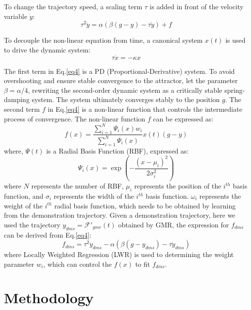 \documentclass[conference]{IEEEtran}
\begin{document}
To change the trajectory speed, a scaling term $\tau$ is added in front of the velocity variable $\dot y$:
\begin{equation}
    \tau^2 \ddot y = \alpha(\beta(g-y)-\tau \dot y) + f
\end{equation}

To decouple the non-linear equation from time, a canonical system $x(t)$ is used to drive the dynamic system:
\begin{equation}
    \tau \dot x = - \kappa x
\end{equation}

The first term in Eq.\ref{eq4} is a PD (Proportional-Derivative) system. To avoid overshooting and ensure stable convergence to the attractor, let the parameter $\beta = \alpha / 4$, rewriting the second-order dynamic system as a critically stable spring-damping system. The system ultimately converges stably to the position $g$. The second term $f$ in Eq.\ref{eq4} is a non-linear function that controls the intermediate process of convergence. The non-linear function $f$ can be expressed as:
\begin{equation}
    f(x)=\frac{\sum\limits_{i=1}^{N} \Psi_{i}(x) w_{i}}{\sum\limits_{i=1}^{N} \Psi_{i}(x)}x(t)(g-y)
    \label{eq5}
\end{equation}
where, $\Psi(t)$ is a Radial Basis Function (RBF), expressed as:
\begin{equation}
    \Psi_i(x)= \exp \left(-\frac{\left(x-\mu_i \right)^{2}}{2 \sigma_i^{2}}\right)
\end{equation}
where $N$ represents the number of RBF, $\mu_i$ represents the position of the $i^{th}$ basis function, and $\sigma_i$ represents the width of the $i^{th}$ basis function. $\omega_i$ represents the weight of the $i^{th}$ radial basis function, which needs to be obtained by learning from the demonstration trajectory. Given a demonstration trajectory, here we used the trajectory $y_{dms}=\mathcal{F}' _{gmr}(t)$ obtained by GMR, the expression for $f_{dms}$ can be derived from Eq.\ref{eq4}:
\begin{equation}
    f_{dms} = \tau^2 \ddot y_{dms} - \alpha(\beta (g-y_{dms})-\tau \dot y_{dms})
    \label{eq6}
\end{equation}
where Locally Weighted Regression (LWR) is used to determining the weight parameter $w_{i}$, which can control the $f(x)$ to fit $f_{dms}$.

\section{Methodology}
\end{document}
